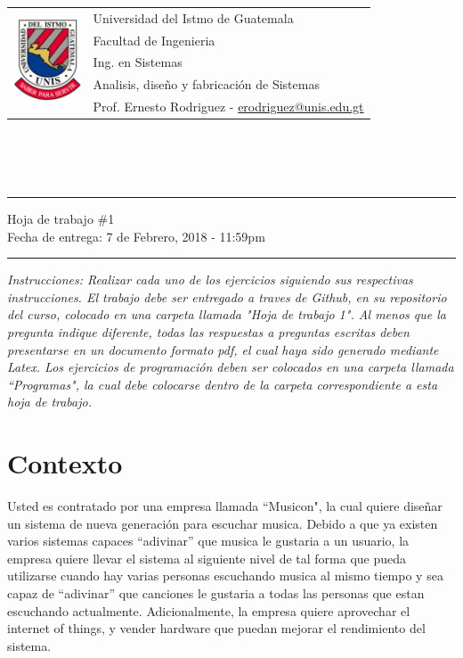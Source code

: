 \documentclass{article}
\newcommand{\horrule}[1]{\rule{\linewidth}{#1}}
\newcommand{\perlscript}[2]{
\begin{itemize}
\item[]
\end{itemize}
}
\begin{document}
\begin{tabular}{l l}
\multirow{5}{*}{\includegraphics[width=2cm]{../../Recursos/logo.png}} & Universidad del Istmo de Guatemala \\
 & Facultad de Ingenieria \\
 & Ing. en Sistemas \\
 & Analisis, dise\~no y fabricaci\'on de Sistemas \\
 & Prof. Ernesto Rodriguez - \href{mailto:erodriguez@unis.edu.gt}{erodriguez@unis.edu.gt} \\
\end{tabular}
\\\\\\

\begin{center}
        \horrule{0.5pt}
        \huge{Hoja de trabajo \#1} \\
        \large{Fecha de entrega: 7 de Febrero, 2018 - 11:59pm} \\
        \horrule{1pt}
\end{center}

\emph{Instrucciones: Realizar cada uno de los ejercicios siguiendo sus respectivas
instrucciones. El trabajo debe ser entregado a traves de Github, en su repositorio del curso, colocado
en una carpeta llamada "Hoja de trabajo 1". Al menos que la pregunta indique diferente, todas las
respuestas a preguntas escritas deben presentarse en un documento formato pdf, el cual haya 
sido generado mediante Latex. Los ejercicios de programaci\'on deben ser colocados en una carpeta
llamada ``Programas", la cual debe colocarse dentro de la carpeta correspondiente a esta hoja de trabajo.}


\section*{Contexto}

Usted es contratado por una empresa llamada ``Musicon", la cual quiere dise\~nar un sistema
de nueva generaci\'on para escuchar musica. Debido a que ya existen varios sistemas capaces
``adivinar'' que musica le gustaria a un usuario, la empresa quiere llevar el sistema al
siguiente nivel de tal forma que pueda utilizarse cuando hay varias personas escuchando
musica al mismo tiempo y sea capaz de ``adivinar'' que canciones le gustaria a todas
las personas que estan escuchando actualmente. Adicionalmente, la empresa quiere aprovechar
el internet of things, y vender hardware que puedan mejorar el rendimiento del sistema.
\end{document}
